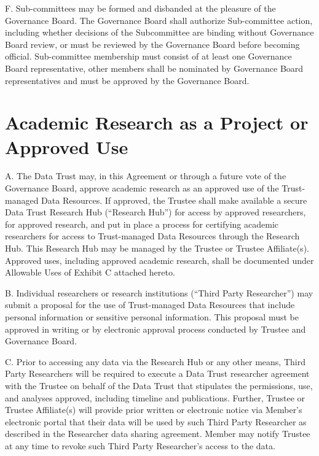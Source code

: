 \documentclass[]{book}
\begin{document}
F. Sub-committees may be formed and disbanded at the pleasure of the Governance Board. The Governance Board shall authorize Sub-committee action, including whether decisions of the Subcommittee are binding without Governance Board review, or must be reviewed by the Governance Board before becoming official. Sub-committee membership must consist of at least one Governance Board representative, other members shall be nominated by Governance Board representatives and must be approved by the Governance Board.

\hypertarget{academic-research-as-a-project-or-approved-use}{%
\chapter{Academic Research as a Project or Approved Use}\label{academic-research-as-a-project-or-approved-use}}

A. The Data Trust may, in this Agreement or through a future vote of the Governance Board, approve academic research as an approved use of the Trust-managed Data Resources. If approved, the Trustee shall make available a secure Data Trust Research Hub (``Research Hub'') for access by approved researchers, for approved research, and put in place a process for certifying academic researchers for access to Trust-managed Data Resources through the Research Hub. This Research Hub may be managed by the Trustee or Trustee Affiliate(s). Approved uses, including approved academic research, shall be documented under Allowable Uses of Exhibit C attached hereto.

B. Individual researchers or research institutions (``Third Party Researcher'') may submit a proposal for the use of Trust-managed Data Resources that include personal information or sensitive personal information. This proposal must be approved in writing or by electronic approval process conducted by Trustee and Governance Board.

C. Prior to accessing any data via the Research Hub or any other means, Third Party Researchers will be required to execute a Data Trust researcher agreement with the Trustee on behalf of the Data Trust that stipulates the permissions, use, and analyses approved, including timeline and publications. Further, Trustee or Trustee Affiliate(s) will provide prior written or electronic notice via Member's electronic portal that their data will be used by such Third Party Researcher as described in the Researcher data sharing agreement. Member may notify Trustee at any time to revoke such Third Party Researcher's access to the data.
\end{document}
